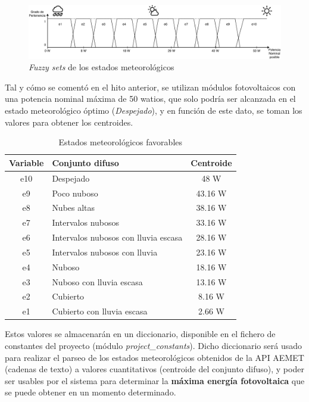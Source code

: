 \begin{figure}[h]
	\centering
	\includegraphics[width=17cm]{figs/Fuzzy_diagram.pdf}
	\caption{\textit{Fuzzy sets} de los estados meteorológicos}
        \label{fig:fuzzySets}
\end{figure}

Tal y cómo se comentó en el hito anterior, se utilizan módulos fotovoltaicos con una potencia nominal máxima de 50 watios, que solo podría ser alcanzada en el estado meteorológico óptimo (\textit{Despejado}), y en función de este dato, se toman los valores para obtener los centroides.
\begin{table}[hp]
        \centering
        \begin{tabular}{|c|l|c|}
                \hline
                \textbf{Variable} & \textbf{Conjunto difuso} & \textbf{Centroide} \\ \hline
                e10 & Despejado & 48 W \\ \hline
                e9 & Poco nuboso & 43.16 W \\ \hline
                e8 & Nubes altas & 38.16 W \\ \hline
                e7 & Intervalos nubosos & 33.16 W \\ \hline
                e6 & Intervalos nubosos con lluvia escasa & 28.16 W \\ \hline
                e5 & Intervalos nubosos con lluvia & 23.16 W \\ \hline
                e4 & Nuboso & 18.16 W \\ \hline
                e3 & Nuboso con lluvia escasa & 13.16 W \\ \hline
                e2 & Cubierto & 8.16 W \\ \hline
                e1 & Cubierto con lluvia escasa & 2.66 W\\ \hline
        \end{tabular}
        \caption{Estados meteorológicos favorables}
        \label{tab:estadosFavorables}
\end{table}

Estos valores se almacenarán en un diccionario, disponible en el fichero de constantes del proyecto (módulo \textit{project\_constants}). Dicho diccionario será usado para realizar el parseo de los estados meteorológicos obtenidos de la API AEMET (cadenas de texto) a valores cuantitativos (centroide del conjunto difuso), y poder ser usables por el sistema para determinar la \textbf{máxima energía fotovoltaica} que se puede obtener en un momento determinado.
